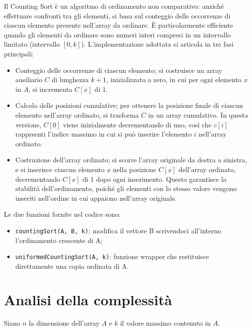 \documentclass[a4paper, 12pt, oneside]{book}
\begin{document}
Il Counting Sort è un algoritmo di ordinamento non comparativo: anziché effettuare confronti tra gli elementi, si basa sul conteggio delle occorrenze di ciascun elemento presente nell'array da ordinare.
È particolarmente efficiente quando gli elementi da ordinare sono numeri interi compresi in un intervallo limitato (intervallo \([0, k]\)).
L'implementazione adottata si articola in tre fasi principali:

\begin{itemize}
    \item Conteggio delle occorrenze di ciascun elemento; si costruisce un array ausiliario \(C\) di lunghezza \(k+1\), inizializzato a zero, in cui per ogni elemento \(x\) in \(A\), si incrementa \(C[x]\) di 1.
    \item Calcolo delle posizioni cumulative; per ottenere la posizione finale di ciascun elemento nell'array ordinato, si trasforma \(C\) in un array cumulativo. In questa versione, \(C[0]\) viene inizialmente decrementando di uno, così che \(c[i]\) rapprsenti l'indice massimo in cui si può inserire l'elemento \(i\) nell'array ordinato.
    \item Costruzione dell'array ordinato; si scorre l'array originale da destra a sinistra, e si inserisce ciascun elemento \(x\) nella posizione \(C[x]\) dell'array ordinato, decrementando \(C[x]\) di 1 dopo ogni inserimento. Questo garantisce la stabilità dell'ordinamento, poiché gli elementi con lo stesso valore vengono inseriti nell'ordine in cui appaiono nell'array originale.
\end{itemize}

\noindent Le due funzioni fornite nel codice sono:

\begin{itemize}
    \item \texttt{countingSort(A, B, k)}: modifica il vettore B scrivendoci all'interno l'ordinamento crescente di A;
    \item \texttt{uniformedCountingSort(A, k)}: funzione wrapper che restituisce direttamente una copia ordinata di A.
\end{itemize}

\section{Analisi della complessità}

Siano \(n\) la dimensione dell'array \(A\) e \(k\) il valore massimo contenuto in \(A\). \\
\end{document}
